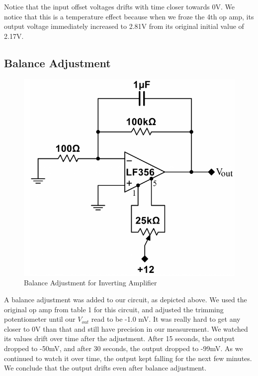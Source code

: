 \documentclass{article}
\begin{document}
    Notice that the input offset voltages drifts with time closer towards 0V. We notice that this is a temperature effect because when we froze the 4th op amp, its output voltage immediately increased to 2.81V from its original initial value of 2.17V.

\subsection{Balance Adjustment}
    \begin{figure}[H]
        \centering
        \includegraphics[scale = 0.5]{2.png}
        \caption{Balance Adjustment for Inverting Amplifier \cite{lab8}}
        \label{fig:my_label}
    \end{figure}
    A balance adjustment was added to our circuit, as depicted above. We used the original op amp from table 1 for this circuit, and adjusted the trimming potentiometer until our $V_{out}$ read to be -1.0 mV. It was really hard to get any closer to 0V than that and still have precision in our measurement. We watched its values drift over time after the adjustment. After 15 seconds, the output dropped to -50mV, and after 30 seconds, the output dropped to -99mV. As we continued to watch it over time, the output kept falling for the next few minutes. We conclude that the output drifts even after balance adjustment.

\end{document}
